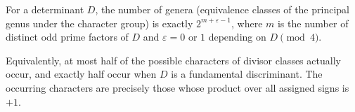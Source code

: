 For a determinant $D$, the number of genera (equivalence classes of the principal genus under the character group) is exactly $2^{m+\varepsilon-1}$, where $m$ is the number of distinct odd prime factors of $D$ and $\varepsilon = 0$ or $1$ depending on $D \pmod{4}$.

Equivalently, at most half of the possible characters of divisor classes actually occur, and exactly half occur when $D$ is a fundamental discriminant. The occurring characters are precisely those whose product over all assigned signs is $+1$.
